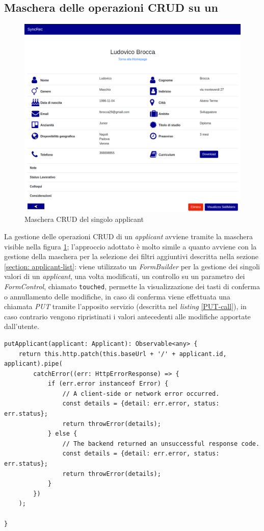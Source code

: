 \subsection{Maschera delle operazioni CRUD su un\applicant}\label{CRUD}
\vspace{0.5em}
\begin{figure}[!h] 
	\centering 
	\includegraphics[width=1\columnwidth]{immagini/svil/applicant}
	\caption{Maschera CRUD del singolo applicant}
	\label{figura:applicant}
\end{figure}
La gestione delle operazioni \gls{CRUD} di un \textit{applicant} avviene tramite la maschera visible nella figura \ref{figura:applicant}; l'approccio adottato è molto simile a quanto avviene con la gestione della maschera per la selezione dei filtri aggiuntivi descritta nella sezione \ref{section: applicant-list}: viene utilizzato un \textit{FormBuilder} per la gestione dei singoli valori di un \textit{applicant}, una volta modificati, un controllo su un parametro dei \textit{FormControl}, chiamato \texttt{touched}, permette la visualizzazione dei tasti di conferma o annullamento delle modifiche, in caso di conferma viene effettuata una chiamata \textit{PUT} tramite l'apposito servizio (descritta nel \textit{listing} \ref{PUT-call}), in caso contrario vengono ripristinati i valori antecedenti alle modifiche apportate dall'utente.\\
\newpage
\begin{lstlisting}[label=PUT-call, caption=chiamata PUT al microservizio del Back-end di SyncRec]
putApplicant(applicant: Applicant): Observable<any> {
	return this.http.patch(this.baseUrl + '/' + applicant.id, applicant).pipe(
		catchError((err: HttpErrorResponse) => {
			if (err.error instanceof Error) {
				// A client-side or network error occurred.
				const details = {detail: err.error, status: err.status};
				return throwError(details);
			} else {
				// The backend returned an unsuccessful response code.
				const details = {detail: err.error, status: err.status};
				return throwError(details);
			}
		})
	);
	
}
\end{lstlisting}
